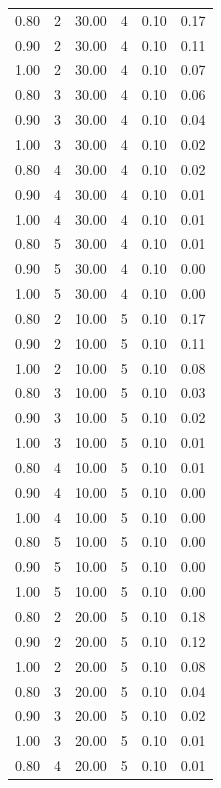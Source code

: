 \documentclass[12pt]{article}
\begin{document}
{\begin{longtable}{cccccc}
  0.80 &   2 & 30.00 &   4 & 0.10 & 0.17 \\ 
  0.90 &   2 & 30.00 &   4 & 0.10 & 0.11 \\ 
  1.00 &   2 & 30.00 &   4 & 0.10 & 0.07 \\ 
  0.80 &   3 & 30.00 &   4 & 0.10 & 0.06 \\ 
  0.90 &   3 & 30.00 &   4 & 0.10 & 0.04 \\ 
  1.00 &   3 & 30.00 &   4 & 0.10 & 0.02 \\ 
  0.80 &   4 & 30.00 &   4 & 0.10 & 0.02 \\ 
  0.90 &   4 & 30.00 &   4 & 0.10 & 0.01 \\ 
  1.00 &   4 & 30.00 &   4 & 0.10 & 0.01 \\ 
  0.80 &   5 & 30.00 &   4 & 0.10 & 0.01 \\ 
  0.90 &   5 & 30.00 &   4 & 0.10 & 0.00 \\ 
  1.00 &   5 & 30.00 &   4 & 0.10 & 0.00 \\ 
  0.80 &   2 & 10.00 &   5 & 0.10 & 0.17 \\ 
  0.90 &   2 & 10.00 &   5 & 0.10 & 0.11 \\ 
  1.00 &   2 & 10.00 &   5 & 0.10 & 0.08 \\ 
  0.80 &   3 & 10.00 &   5 & 0.10 & 0.03 \\ 
  0.90 &   3 & 10.00 &   5 & 0.10 & 0.02 \\ 
  1.00 &   3 & 10.00 &   5 & 0.10 & 0.01 \\ 
  0.80 &   4 & 10.00 &   5 & 0.10 & 0.01 \\ 
  0.90 &   4 & 10.00 &   5 & 0.10 & 0.00 \\ 
  1.00 &   4 & 10.00 &   5 & 0.10 & 0.00 \\ 
  0.80 &   5 & 10.00 &   5 & 0.10 & 0.00 \\ 
  0.90 &   5 & 10.00 &   5 & 0.10 & 0.00 \\ 
  1.00 &   5 & 10.00 &   5 & 0.10 & 0.00 \\ 
  0.80 &   2 & 20.00 &   5 & 0.10 & 0.18 \\ 
  0.90 &   2 & 20.00 &   5 & 0.10 & 0.12 \\ 
  1.00 &   2 & 20.00 &   5 & 0.10 & 0.08 \\ 
  0.80 &   3 & 20.00 &   5 & 0.10 & 0.04 \\ 
  0.90 &   3 & 20.00 &   5 & 0.10 & 0.02 \\ 
  1.00 &   3 & 20.00 &   5 & 0.10 & 0.01 \\ 
  0.80 &   4 & 20.00 &   5 & 0.10 & 0.01 \\ 

\end{longtable}}
\end{document}
